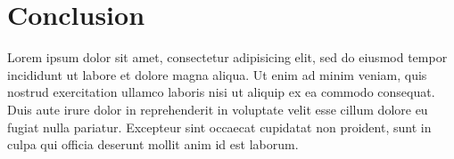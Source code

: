 \documentclass[journal]{IEEEtran}
\begin{document}
%





\section{Conclusion}
Lorem ipsum dolor sit amet, consectetur adipisicing elit, sed do
eiusmod tempor incididunt ut labore et dolore magna aliqua. Ut
enim ad minim veniam, quis nostrud exercitation ullamco laboris
nisi ut aliquip ex ea commodo consequat. Duis aute irure dolor
in reprehenderit in voluptate velit esse cillum dolore eu fugiat
nulla pariatur. Excepteur sint occaecat cupidatat non proident,
sunt in culpa qui officia deserunt mollit anim id est laborum.
\end{document}
